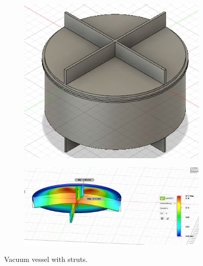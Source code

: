\begin{figure}[H]
    \centering
    \begin{subfigure}[b]{0.3\textwidth}
        \centering
        \includegraphics[width=1\textwidth]{sections/imges/vacuum_vessel/Keksdose_Streben.PNG}
        \subcaption{}
        \label{fig:Strebendose}
    \end{subfigure}
    \hfil
    \begin{subfigure}[b]{0.59\textwidth}
        \centering
        \includegraphics[width=1\textwidth]{sections/imges/vacuum_vessel/Simulation_palatschinkendeckel_mit_Streben_30.PNG}
        \label{fig:Strebendose_FEM}
    \end{subfigure}
    \caption{Vacuum vessel with struts.}
    \label{fig:Strebendose_all}
\end{figure}

